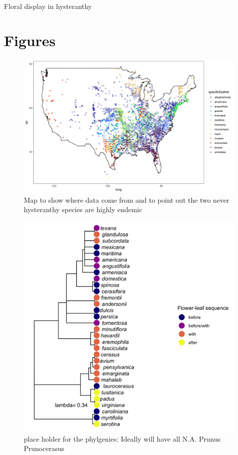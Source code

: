 \documentclass{article}\usepackage[]{graphicx}\usepackage[]{color}
\begin{document}
\secction Floral display in hysteranthy 




\newpage
\section*{Figures}
    \begin{figure}[h!]
    \centering
 \includegraphics[width=\textwidth]{..//..//Plots/map.jpeg}
    \caption{Map to show where data come from and to point out the two never hysteranthy species are highly endemic}
    \label{fig:mappy}
\end{figure}

\begin{figure}[h!]
    \centering
 \includegraphics[width=\textwidth]{..//..//Plots/phylosig1.jpeg}
    \caption{place holder for the phylgenies: Ideally will have all N.A. Prunus  Prunocerasus }
    \label{fig:phylo1}
\end{figure}
\end{document}
